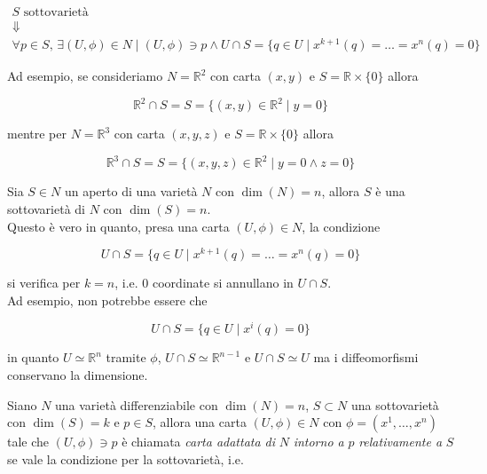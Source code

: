 \begin{gather}
	S \text{ sottovarietà}\nonumber\\
	\Downarrow\\
	\forall p \in S, \, \exists (U,\phi) \in N \mid (U,\phi) \ni p \wedge U \cap S = \{ q \in U \mid x^{k+1}(q) = \dots = x^{n}(q) = 0 \}\nonumber
\end{gather}

Ad esempio, se consideriamo $ N = \mathbb{R}^{2} $ con carta $ (x,y) $ e $ S = \mathbb{R} \times \{0\} $ allora

\begin{equation}
	\mathbb{R}^{2} \cap S = S = \{ (x,y) \in \mathbb{R}^{2} \mid y=0 \}
\end{equation}

mentre per $ N = \mathbb{R}^{3} $ con carta $ (x,y,z) $ e $ S = \mathbb{R} \times \{0\} $ allora

\begin{equation}
	\mathbb{R}^{3} \cap S = S = \{ (x,y,z) \in \mathbb{R}^{2} \mid y=0 \wedge z=0 \}
\end{equation}

\begin{remark}
	Sia $ S \in N $ un aperto di una varietà $ N $ con $ \dim(N)=n $, allora $ S $ è una sottovarietà di $ N $ con $ \dim(S)=n $.\\
	Questo è vero in quanto, presa una carta $ (U,\phi) \in N $, la condizione
	
	\begin{equation}
		U \cap S = \{ q \in U \mid x^{k+1}(q) = \dots = x^{n}(q) = 0 \}
	\end{equation}

	si verifica per $ k=n $, i.e. 0 coordinate si annullano in $ U \cap S $.\\
	Ad esempio, non potrebbe essere che
	
	\begin{equation}
		U \cap S = \{ q \in U \mid x^{i}(q) = 0 \}
	\end{equation}

	in quanto $ U \simeq \mathbb{R}^{n} $ tramite $ \phi $, $ U \cap S \simeq \mathbb{R}^{n-1} $ e $ U \cap S \simeq U $ ma i diffeomorfismi conservano la dimensione.
\end{remark}

Siano $ N $ una varietà differenziabile con $ \dim(N)=n $, $ S \subset N $ una sottovarietà con $ \dim(S)=k $ e $ p \in S $, allora una carta $ (U,\phi) \in N $ con $ \phi = (x^{1},\dots,x^{n}) $ tale che $ (U,\phi) \ni p $ è chiamata \textit{carta adattata di} $ N $ \textit{intorno a} $ p $ \textit{relativamente a} $ S $ se vale la condizione per la sottovarietà, i.e.

